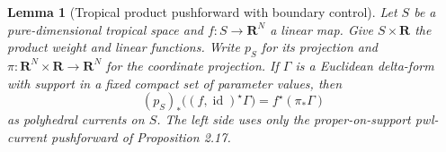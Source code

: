 \documentclass[11pt,a4paper]{article}
\newtheorem{lemma}[theorem]{Lemma}
\theoremstyle{definition}
\theoremstyle{remark}
\begin{document}
\begin{lemma}[Tropical product pushforward with boundary control]
\label{r11p:tropical-product-push}
Let $S$ be a pure-dimensional tropical space and
$f:S\to\mathbf R^N$ a linear map.  Give $S\times\mathbf R$ the
product weight and linear functions.  Write $p_S$ for its projection
and $\pi:\mathbf R^N\times\mathbf R\to\mathbf R^N$ for the coordinate
projection.  If $\Gamma$ is a Euclidean delta-form with support in
a fixed compact set of parameter values, then
\[
 (p_S)_*\bigl((f,\operatorname{id})^\star\Gamma\bigr)
                                      =f^\star(\pi_*\Gamma)
\tag{PS2}\label{r11p:tropical-product-push-identity}
\]
as polyhedral currents on $S$.  The left side uses only the
proper-on-support pwl-current pushforward of Proposition 2.17.
\end{lemma}
\end{document}
